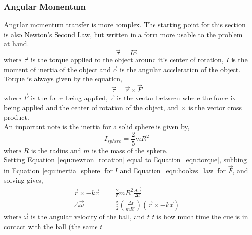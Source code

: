 \documentclass[12pt]{article}
\begin{document}
            \subsubsection{Angular Momentum}
            Angular momentum transfer is more complex. The starting point for this section is also Newton's Second Law, but written
            in a form more usable to the problem at hand.
            \begin{equation}
                \vec \tau = I \vec \alpha
                \label{equ:newton_rotation}
            \end{equation}
            where $\vec \tau$ is the torque applied to the object around it's center of rotation, $I$ is the moment of inertia of the
            object and $\vec \alpha$ is the angular acceleration of the object.
            \\
            Torque is always given by the equation,
            \begin{equation}
                \vec \tau = \vec r \times \vec F
                \label{equ:torque}
            \end{equation}
            where $\vec F$ is the force being applied, $\vec r$ is the vector between where the force is being applied and the center
            of rotation of the object, and $\times$ is the vector cross product.
            \\
            An important note is the inertia for a solid sphere is given by,
            \begin{equation}
                I_{sphere} = \frac{2}{5} m R^2
                \label{equ:inertia_sphere}
            \end{equation}
            where $R$ is the radius and $m$ is the mass of the sphere.
            \\
            Setting Equation~\ref{equ:newton_rotation} equal to Equation~\ref{equ:torque}, subbing in Equation~\ref{equ:inertia_sphere}
            for $I$ and Equation~\ref{equ:hookes_law} for $\vec F$, and solving gives,
            \begin{eqnarray}
                \vec r \times -k \vec x &=& \frac{2}{5} m R^2 \frac{\Delta \vec \omega}{\Delta t} \nonumber \\
                \Delta \vec \omega &=& \frac{5}{2} \left(\frac{\Delta t}{m R^2}\right) (\vec r \times -k \vec x) \nonumber
            \end{eqnarray}
            where $\vec \omega$ is the angular velocity of the ball, and $t$ $t$ is how much time the cue is in contact with the ball (the same $t$
\end{document}
